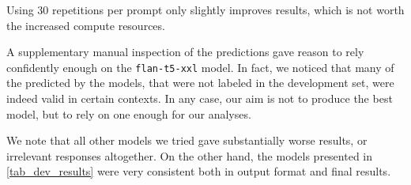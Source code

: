 \begin{table}[b]
    \centering
    \caption{The results on the \textit{development} set of the main models in the initial assessment. The Macro $F_1$ score is computed based on optimal thresholds for each of the \taxtypes{}.}
    \label{tab_dev_results}
\end{table}

Using 30 repetitions per prompt only slightly improves results, which is not worth the increased compute resources.

A supplementary manual inspection of the predictions gave reason to rely confidently enough on the \texttt{flan-t5-xxl} model. In fact, we noticed that many of the \taxtypes{} predicted by the models, that were not labeled in the development set, were indeed valid in certain contexts. In any case, our aim is not to produce the best model, but to rely on one enough for our analyses.

We note that all other models we tried gave substantially worse results, or irrelevant responses altogether. On the other hand, the models presented in \autoref{tab_dev_results} were very consistent both in output format and final results.



